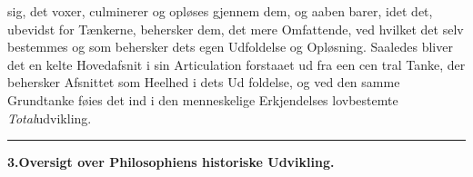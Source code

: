 \documentclass[12pt,a4paper]{book}
\newcommand{\divrule}{\begin{center}\rule{2cm}{0.4pt}\end{center}}
\begin{document}
sig, det voxer, culminerer og opløses gjennem dem, og aaben\-%
barer, idet det, ubevidst for Tænkerne, behersker dem, det mere
Omfattende, ved hvilket det selv bestemmes og som behersker
dets egen Udfoldelse og Opløsning. Saaledes bliver det en\-%
kelte Hovedafsnit i sin Articulation forstaaet ud fra een cen\-%
tral Tanke, der behersker Afsnittet som Heelhed i dets Ud\-%
foldelse, og ved den samme Grundtanke føies det ind i den
menneskelige Erkjendelses lovbestemte \emph{Total}udvikling.
\divrule
\begin{center}
\textbf{3.\enspace Oversigt over Philosophiens historiske Udvikling.}
\end{center}
\end{document}

